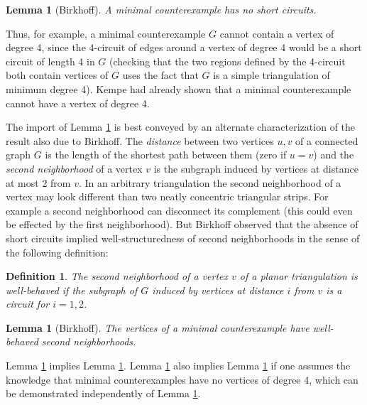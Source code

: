 \documentclass[11pt]{article}
\newtheorem{lemma}[theorem]{Lemma}     %
\newtheorem{definition}[theorem]{Definition}
\begin{document}
\begin{lemma}[Birkhoff]\label{int6a}
A minimal counterexample has no short circuits. 
\end{lemma}

\noindent Thus, for example, a minimal counterexample $G$ cannot contain a vertex of degree 4, since the 4-circuit of edges around a vertex of degree 4 would be a short circuit of length 4 in $G$ (checking that the two regions defined by the 4-circuit both contain vertices of $G$ 
uses the fact that $G$ is a simple triangulation of minimum degree 4). Kempe \cite{kempe} had already shown that a minimal counterexample cannot have a vertex of degree 4.

The import of Lemma \ref{int6a} is best conveyed by an alternate characterization of the result also due to Birkhoff. The \emph{distance} between two vertices $u, v$ of a connected graph $G$ is the length of the shortest path between them (zero if $u = v$) and the \emph{second neighborhood} of a vertex $v$ is the subgraph induced by vertices at distance at most 2 from $v$. 
In an arbitrary triangulation the second neighborhood of a vertex may look different than two neatly concentric triangular strips. For example 
a second neighborhood can disconnect its complement (this could even be effected by the first neighborhood).
But Birkhoff observed that the absence of short circuits implied well-structuredness of second neighborhoods in the sense of the following definition:

\begin{definition}
The second neighborhood of a vertex $v$ of a planar triangulation is \emph{well-behaved} if the subgraph of $G$ induced by vertices at distance $i$ from $v$ is a circuit for $i = 1, 2$.
\end{definition}

\begin{lemma}[Birkhoff]\label{nn}
The vertices of a minimal counterexample have well-behaved second neighborhoods.
\end{lemma}

\noindent Lemma \ref{int6a} implies Lemma \ref{nn}. Lemma \ref{nn} also implies Lemma \ref{int6a} if one assumes the knowledge that minimal counterexamples have no vertices of degree 4, which can be demonstrated independently of Lemma \ref{int6a}.
\end{document}
